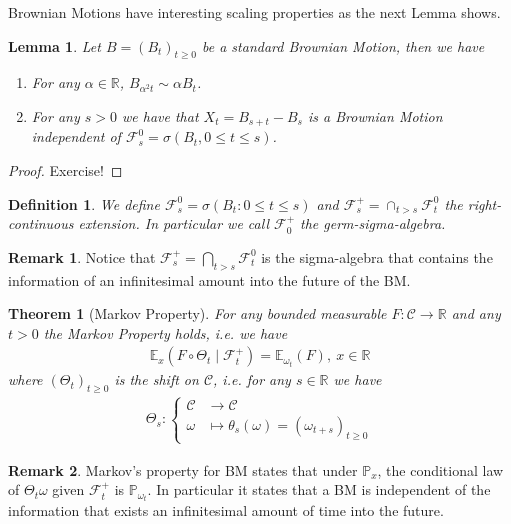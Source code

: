 \documentclass[11pt,a4paper, final]{article}
\newtheorem{lem}{Lemma}[section]
\newtheorem{thm}{Theorem}[section]
\newtheorem{defn}{Definition}[section]
\theoremstyle{definition}
\newtheorem{rem}{Remark}[section]
\begin{document}
\noindent Brownian Motions have interesting scaling properties as the next Lemma shows.
\begin{lem} Let $B=(B_t)_{t \geq 0}$ be a standard Brownian Motion, then we have 
\begin{enumerate}
\item For any $\alpha \in \mathbb{R}$, $B_{ \alpha^2 t} \sim \alpha B_t$.
\item For any $s >0$ we have that $X_t = B_{s+t}-B_s$ is a Brownian Motion independent of $\mathcal{F}_s^0 = \sigma ( B_t, 0 \leq t \leq s )$. 
\end{enumerate} 
\end{lem}
\begin{proof}
Exercise!
\end{proof}
\begin{defn} We define $\mathcal{F}_s^0 = \sigma ( B_t : 0 \leq t \leq s)$ and $\mathcal{F}_s^+ = \cap_{t >s} \mathcal{F}_t^0$ the right-continuous extension. In particular we call $\mathcal{F}_0^+$ the germ-sigma-algebra. 
\end{defn}
\begin{rem} Notice that $\mathcal{F}_s^+ = \bigcap_{t>s}\mathcal{F}_t^0$ is the sigma-algebra that contains the information of an infinitesimal amount into the future of the BM.
\end{rem}
\begin{thm}[Markov Property] For any bounded measurable $F: \mathcal{C} \to \mathbb{R}$ and any $t >0$ the Markov Property holds, i.e. we have
\begin{align*}
\mathbb{E}_x ( F \circ \Theta_t \mid \mathcal{F}_t^+ ) = \mathbb{E}_{ \omega_t} (F), \ x \in \mathbb{R}
\end{align*}
where $(\Theta_t)_{t \geq 0}$ is the shift on $\mathcal{C}$, i.e. for any $s \in \mathbb{R}$ we have 
\begin{align*}
\Theta_s : \begin{cases} \mathcal{C} & \longrightarrow \mathcal{C} \\
\omega & \longmapsto \theta_s( \omega) = (\omega_{t+s})_{t \geq 0}
\end{cases}
\end{align*}
\end{thm}
\begin{rem} Markov's property for BM states that under $\mathbb{P}_x$, the conditional law of $\Theta_t \omega$ given $\mathcal{F}_t^+$ is $\mathbb{P}_{ \omega_t}$. In particular it states that a BM is independent of the information that exists an infinitesimal amount of time into the future. 
\end{rem}
\end{document}
